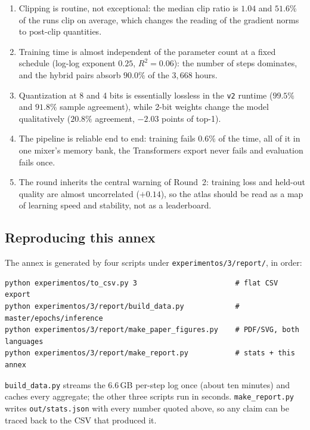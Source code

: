\begin{enumerate}[leftmargin=1.4em,itemsep=2pt]
\item Clipping is routine, not exceptional: the median clip ratio is $1.04$ and $51.6\%$ of the runs clip on average, which changes the reading of the gradient norms to post-clip quantities.
\item Training time is almost independent of the parameter count at a fixed schedule (log-log exponent $0.25$, $R^2=0.06$): the number of steps dominates, and the hybrid pairs absorb $90.0\%$ of the $3{,}668$ hours.
\item Quantization at 8 and 4 bits is essentially lossless in the \texttt{v2} runtime ($99.5\%$ and $91.8\%$ sample agreement), while 2-bit weights change the model qualitatively ($20.8\%$ agreement, $-2.03$ points of top-1).
\item The pipeline is reliable end to end: training fails $0.6\%$ of the time, all of it in one mixer's memory bank, the Transformers export never fails and evaluation fails once.
\item The round inherits the central warning of Round~2: training loss and held-out quality are almost uncorrelated ($+0.14$), so the atlas should be read as a map of learning speed and stability, not as a leaderboard.
\end{enumerate}

\subsection{Reproducing this annex}

The annex is generated by four scripts under \texttt{experimentos/3/report/}, in order:

\begin{verbatim}
python experimentos/to_csv.py 3                       # flat CSV export
python experimentos/3/report/build_data.py            # master/epochs/inference
python experimentos/3/report/make_paper_figures.py    # PDF/SVG, both languages
python experimentos/3/report/make_report.py           # stats + this annex
\end{verbatim}

\texttt{build\_data.py} streams the 6.6\,GB per-step log once (about ten minutes) and caches every aggregate; the other three scripts run in seconds. \texttt{make\_report.py} writes \texttt{out/stats.json} with every number quoted above, so any claim can be traced back to the CSV that produced it.
